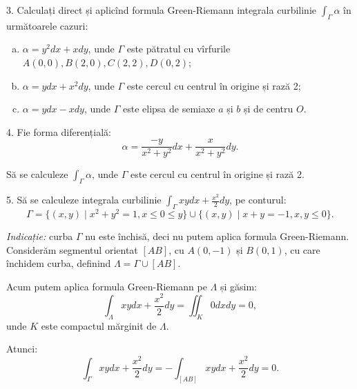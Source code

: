 \documentclass[11pt,a4paper]{article}
\newcommand\ds{\displaystyle}
\theoremstyle{dotless}
\theoremstyle{dotlessdr}
\begin{document}
\vspace{1cm}

3. Calculați direct și aplicînd formula Green-Riemann integrala curbilinie
$ \ds\int_\Gamma \alpha $ în următoarele cazuri:
\begin{enumerate}[(a)]
\item $ \alpha = y^2 dx + xdy $, unde $ \Gamma $ este pătratul cu vîrfurile
  $ A(0, 0), B(2, 0), C(2, 2), D(0, 2)$;
\item $ \alpha = ydx + x^2 dy $, unde $ \Gamma $ este cercul cu centrul în
  origine și rază 2;
\item $ \alpha = ydx - xdy $, unde $ \Gamma $ este elipsa de semiaxe
  $ a $ și $ b $ și de centru $ O $.
\end{enumerate}

\vspace{1cm}

4. Fie forma diferențială:
\[
  \alpha = \frac{-y}{x^2 + y^2} dx + \frac{x}{x^2 + y^2} dy.
\]

Să se calculeze $ \int_\Gamma \alpha $, unde $ \Gamma $ este cercul cu centrul
în origine și rază 2.

\vspace{1cm}

5. Să se calculeze integrala curbilinie $ \ds\int_\Gamma xydx + \frac{x^2}{2} dy $,
pe conturul:
\[
  \Gamma = \{(x, y) \mid x^2 + y^2 = 1, x \leq 0 \leq y \} \cup %
  \{(x, y) \mid x + y = -1, x, y \leq 0 \}.
\]

\emph{Indicație:} curba $ \Gamma $ nu este închisă, deci nu putem aplica
formula Green-Riemann. Considerăm segmentul orientat $ [AB] $, cu $ A(0, -1) $ și
$ B(0, 1) $, cu care închidem curba, definind $ \Lambda = \Gamma \cup [AB] $.

Acum putem aplica formula Green-Riemann pe $ \Lambda $ și găsim:
\[
  \int_\Lambda xydx + \frac{x^2}{2} dy = \iint_K 0dxdy = 0,
\]
unde $ K $ este compactul mărginit de $ \Lambda $.

Atunci:
\[
  \int_\Gamma xydx + \frac{x^2}{2} dy = -\int_{[AB]} xydx + \frac{x^2}{2} dy = 0.
\]
\end{document}
